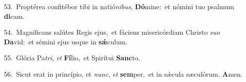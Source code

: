 {\numbfont\textcolor{\numbcolor}{53.}}~Proptérea confitébor tibi in natió\-\textit{ni}\-\textit{bus}, \textbf{Dó}\-mine:~\star et nómini tuo psalmum \textbf{di}\-cam.\par
{\numbfont\textcolor{\numbcolor}{54.}}~Magníficans salútes Regis ejus,~\dagger et fáciens misericórdiam Christo \textit{su}\-\textit{o} \textbf{Da}\-vid:~\star et sémini ejus usque in \textbf{sǽ}\-culum.\par
{\numbfont\textcolor{\numbcolor}{55.}}~Glória Pa\-\textit{tri}\-, \textit{et} \textbf{Fí}\-lio,~\star et Spirítui \textbf{Sanc}\-to.\par
{\numbfont\textcolor{\numbcolor}{56.}}~Sicut erat in princípio, et \textit{nunc}\-, \textit{et} \textbf{sem}\-per,~\star et in sǽcula sæculórum. \textbf{A}\-men.\par
